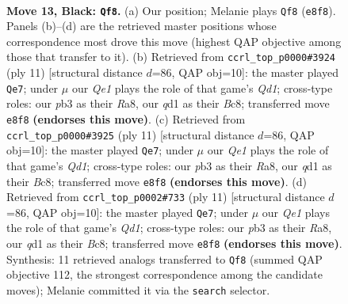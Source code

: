 \documentclass[11pt]{article}
\begin{document}
\clearpage

\begin{figure}[p]\centering
\begin{subfigure}{0.46\textwidth}\centering
\resizebox{\linewidth}{!}{%
\newchessgame
\chessboard[
  setfen={r1b1q1k1/p1pp1ppp/3n1b2/1p6/3P2P1/1P6/P1P2P1P/RNBQ1BK1 b - - 0 13},
  showmover=false,
  pgfstyle=straightmove, color=movearrow, markmove={e8-f8}
]}
\caption{}
\end{subfigure}\hfill
\begin{subfigure}{0.46\textwidth}\centering
\resizebox{\linewidth}{!}{%
\newchessgame
\chessboard[
  setfen={r1bqkb1r/p1pp1ppp/2p2n2/4P3/8/8/PPP2PPP/RNBQKB1R b KQkq - 0 6},
  showmover=false,
  pgfstyle=straightmove, color=movearrow, markmove={d8-e7}
]}
\caption{}
\end{subfigure}
\\[4pt]
\begin{subfigure}{0.46\textwidth}\centering
\resizebox{\linewidth}{!}{%
\newchessgame
\chessboard[
  setfen={r1bqkb1r/p1pp1ppp/2p2n2/4P3/8/8/PPP2PPP/RNBQKB1R b KQkq - 0 6},
  showmover=false,
  pgfstyle=straightmove, color=movearrow, markmove={d8-e7}
]}
\caption{}
\end{subfigure}\hfill
\begin{subfigure}{0.46\textwidth}\centering
\resizebox{\linewidth}{!}{%
\newchessgame
\chessboard[
  setfen={r1bqkb1r/p1pp1ppp/2p2n2/4P3/8/8/PPP2PPP/RNBQKB1R b KQkq - 0 6},
  showmover=false,
  pgfstyle=straightmove, color=movearrow, markmove={d8-e7}
]}
\caption{}
\end{subfigure}
\caption{\textbf{Move 13, Black: \texttt{Qf8}.} (a) Our position; Melanie plays \texttt{Qf8} (\texttt{e8f8}). Panels (b)--(d) are the retrieved master positions whose correspondence most drove this move (highest QAP objective among those that transfer to it). (b) Retrieved from \texttt{ccrl\_top\_p0000\#3924} (ply 11) [structural distance $d$=86, QAP obj=10]: the master played \texttt{Qe7}; under $\mu$ our \emph{Qe1} plays the role of that game's \emph{Qd1}; cross-type roles: our \emph{p}b3 as their \emph{R}a8, our \emph{q}d1 as their \emph{B}c8; transferred move \texttt{e8f8} \textbf{(endorses this move)}. (c) Retrieved from \texttt{ccrl\_top\_p0000\#3925} (ply 11) [structural distance $d$=86, QAP obj=10]: the master played \texttt{Qe7}; under $\mu$ our \emph{Qe1} plays the role of that game's \emph{Qd1}; cross-type roles: our \emph{p}b3 as their \emph{R}a8, our \emph{q}d1 as their \emph{B}c8; transferred move \texttt{e8f8} \textbf{(endorses this move)}. (d) Retrieved from \texttt{ccrl\_top\_p0002\#733} (ply 11) [structural distance $d$=86, QAP obj=10]: the master played \texttt{Qe7}; under $\mu$ our \emph{Qe1} plays the role of that game's \emph{Qd1}; cross-type roles: our \emph{p}b3 as their \emph{R}a8, our \emph{q}d1 as their \emph{B}c8; transferred move \texttt{e8f8} \textbf{(endorses this move)}. Synthesis: 11 retrieved analogs transferred to \texttt{Qf8} (summed QAP objective 112, the strongest correspondence among the candidate moves); Melanie committed it via the \texttt{search} selector.}
\label{fig:thought-m25}
\end{figure}
\end{document}
